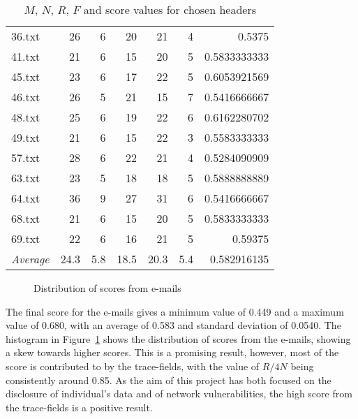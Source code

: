 \begin{table}
\begin{tabular}{@{}lrrrrrr@{}}
36.txt & 26           & 6                     & 20   & 21  & 4   & 0.5375         \\
41.txt & 21           & 6                     & 15   & 20  & 5   & 0.5833333333   \\
45.txt & 23           & 6                     & 17   & 22  & 5   & 0.6053921569   \\
46.txt & 26           & 5                     & 21   & 15  & 7   & 0.5416666667   \\
48.txt & 25           & 6                     & 19   & 22  & 6   & 0.6162280702   \\
49.txt & 21           & 6                     & 15   & 22  & 3   & 0.5583333333   \\
57.txt & 28           & 6                     & 22   & 21  & 4   & 0.5284090909   \\
63.txt & 23           & 5                     & 18   & 18  & 5   & 0.5888888889   \\
64.txt & 36           & 9                     & 27   & 31  & 6   & 0.5416666667   \\
68.txt & 21           & 6                     & 15   & 20  & 5   & 0.5833333333   \\
69.txt & 22           & 6                     & 16   & 21  & 5   & 0.59375        \\ \midrule
\emph{Average} & 24.3 & 5.8                   & 18.5 & 20.3& 5.4 & 0.582916135    \\ \bottomrule
\end{tabular}
\caption{$M$, $N$, $R$, $F$ and score values for chosen headers}
\label{tab:sammn}
\end{table}

\begin{figure}
	\centering{}
\caption{Distribution of scores from e-mails}\label{fig:dis}
\end{figure}

The final score for the e-mails gives a minimum value of 0.449 and a maximum
value of 0.680, with an average of 0.583 and standard deviation of 0.0540. The
histogram in Figure~\ref{fig:dis} shows the distribution of scores from the
e-mails, showing a skew towards higher scores.  This is a promising result,
however, most of the score is contributed to by the trace-fields, with the 
value of $R/4N$ being consistently around 0.85.  As the aim of this project
has both focused on the disclosure of individual's data and of network
vulnerabilities, the high score from the trace-fields is a positive result.


